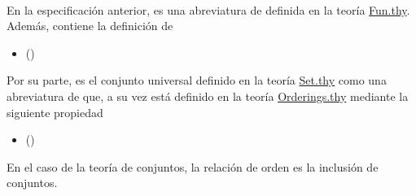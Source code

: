 \begin{isabellebody}
\ \ %
\endisadelimproof
%
\isatagproof
{}\isamarkupfalse%
%
\endisatagproof
{\isafoldproof}%
%
\isadelimproof
%
\endisadelimproof
%
\begin{isamarkuptext}%
En la especificación anterior,  es una 
  abreviatura de  definida en la teoría
  \href{http://bit.ly/2XuPQx5}{Fun.thy}. Además, contiene la definición
  de 
  \begin{itemize}
    \item[]  \hfill ()
  \end{itemize} 
  Por su parte,  es el conjunto universal definido en la 
  teoría \href{http://bit.ly/2XtHCW6}{Set.thy} como una abreviatura de 
   que, a su vez está definido en la teoría 
  \href{http://bit.ly/2Xyj9Pe}{Orderings.thy} mediante la siguiente
  propiedad 
  \begin{itemize}
    \item[]  
      \hfill ()
  \end{itemize} 
  En el caso de la teoría de conjuntos, la relación de orden es la
  inclusión de conjuntos.


\end{isamarkuptext}
\end{isabellebody}
